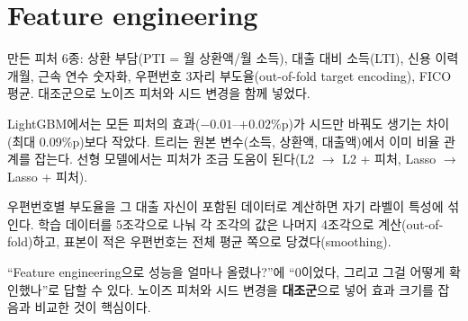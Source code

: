 \section{Feature engineering}
만든 피처 6종: 상환 부담(PTI = 월 상환액/월 소득), 대출 대비 소득(LTI), 신용 이력 개월, 근속 연수 숫자화, 우편번호 3자리 부도율(out-of-fold target encoding), FICO 평균. 대조군으로 노이즈 피처와 시드 변경을 함께 넣었다.

\begin{keybox}[결과 C15, C16, C21]
LightGBM에서는 모든 피처의 효과($-0.01$--$+0.02$\%p)가 시드만 바꿔도 생기는 차이(최대 0.09\%p)보다 작았다. 트리는 원본 변수(소득, 상환액, 대출액)에서 이미 비율 관계를 잡는다. 선형 모델에서는 피처가 조금 도움이 된다(L2 \ensuremath{\to} L2 + 피처, Lasso \ensuremath{\to} Lasso + 피처).
\end{keybox}

\begin{prof}
우편번호별 부도율을 그 대출 자신이 포함된 데이터로 계산하면 자기 라벨이 특성에 섞인다. 학습 데이터를 5조각으로 나눠 각 조각의 값은 나머지 4조각으로 계산(out-of-fold)하고, 표본이 적은 우편번호는 전체 평균 쪽으로 당겼다(smoothing).
\end{prof}

\begin{career}
``Feature engineering으로 성능을 얼마나 올렸나?''에 ``0이었다, 그리고 그걸 어떻게 확인했나''로 답할 수 있다. 노이즈 피처와 시드 변경을 \textbf{대조군}으로 넣어 효과 크기를 잡음과 비교한 것이 핵심이다.
\end{career}
